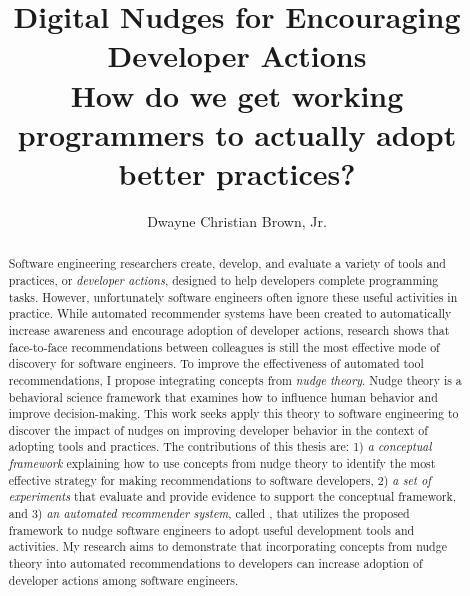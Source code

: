\documentclass[runningheads]{llncs}
\begin{document}
%
\title{Digital Nudges for Encouraging \\Developer Actions
    \\\large How do we get working programmers to actually adopt better practices?}
%
%
\author{Dwayne Christian Brown, Jr.}
%
%
%
\maketitle              %
%
\begin{abstract}
Software engineering researchers create, develop, and evaluate a variety of tools and practices, or \textit{developer actions}, designed to help developers complete programming tasks. However, unfortunately software engineers often ignore these useful activities in practice. While automated recommender systems have been created to automatically increase awareness and encourage adoption of developer actions, research shows that face-to-face recommendations between colleagues is still the most effective mode of discovery for software engineers. To improve the effectiveness of automated tool recommendations, I propose integrating concepts from \textit{nudge theory}. Nudge theory is a behavioral science framework that examines how to influence human behavior and improve decision-making. This work seeks apply this theory to software engineering to discover the impact of nudges on improving developer behavior in the context of adopting tools and practices. The contributions of this thesis are: 1) \textit{a conceptual framework} explaining how to use concepts from nudge theory to identify the most effective strategy for making recommendations to software developers, 2) \textit{a set of experiments} that evaluate and provide evidence to support the conceptual framework, and 3) \textit{an automated recommender system}, called \TOOL, that utilizes the proposed framework to nudge software engineers to adopt useful development tools and activities. My research aims to demonstrate that incorporating concepts from nudge theory into automated recommendations to developers can increase adoption of developer actions among software engineers.
\end{abstract}
\end{document}
